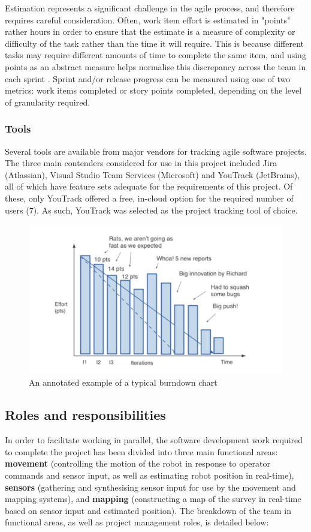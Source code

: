 \documentclass[12pt]{article}
\begin{document}
Estimation represents a significant challenge in the agile process, and therefore requires careful consideration. Often, work item effort is estimated in "points" rather hours in order to ensure that the estimate is a measure of complexity or difficulty of the task rather than the time it will require. This is because different tasks may require different amounts of time to complete the same item, and using points as an abstract measure helps normalise this discrepancy across the team in each sprint \cite{cohn}. Sprint and/or release progress can be measured using one of two metrics: work items completed or story points completed, depending on the level of granularity required.

\subsubsection{Tools}
Several tools are available from major vendors for tracking agile software projects. The three main contenders considered for use in this project included Jira (Atlassian), Visual Studio Team Services (Microsoft) and YouTrack (JetBrains), all of which have feature sets adequate for the requirements of this project. Of these, only YouTrack offered a free, in-cloud option for the required number of users (7). As such, YouTrack was selected as the project tracking tool of choice.

\begin{figure}[h!]
\includegraphics[width=\textwidth]{A_burndown_chart_example.png}
\caption{An annotated example of a typical burndown chart \cite{rasmusson}}
  \label{fig:burndown}
\end{figure}

\subsection{Roles and responsibilities}\label{roles}
In order to facilitate working in parallel, the software development work required to complete the project has been divided into three main functional areas: \textbf{movement} (controlling the motion of the robot in response to operator commands and sensor input, as well as estimating robot position in real-time), \textbf{sensors} (gathering and synthesising sensor input for use by the movement and mapping systems), and \textbf{mapping} (constructing a map of the survey in real-time based on sensor input and estimated position). The breakdown of the team in functional areas, as well as project management roles, is detailed below:
\end{document}
